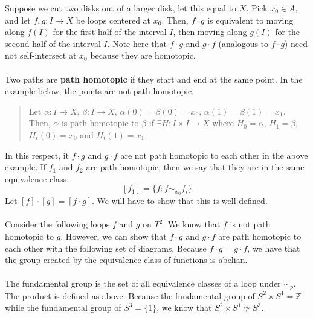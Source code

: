 \documentclass[10pt]{extarticle}
\title{}
\author{Avinash Iyer}
\date{}
\begin{document}
{
\noindent Suppose we cut two disks out of a larger disk, let this equal to $X$. Pick $x_0\in A$, and let $f,g: I\rightarrow X$ be loops centered at $x_0$. Then, $f\cdot g$ is equivalent to moving along $f(I)$ for the first half of the interval $I$, then moving along $g(I)$ for the second half of the interval $I$. Note here that $f\cdot g$ and $g\cdot f$ (analogous to $f\cdot g$) need not self-intersect at $x_0$ because they are homotopic.\\
\\
Two paths are \textbf{path homotopic} if they start and end at the same point. In the example below, the points are not path homotopic.
  \begin{quote}
    Let $\alpha: I\rightarrow X$, $\beta: I\rightarrow X$, $\alpha(0)=\beta(0)=x_0$, $\alpha(1)=\beta(1)=x_1$. Then, $\alpha$ is path homotopic to $\beta$ if $\exists H:I\times I\rightarrow X$ where $H_0 = \alpha$, $H_1 = \beta$, $H_t(0)=x_0$ and $H_t(1)=x_1$.
  \end{quote}
  In this respect, it $f\cdot g$ and $g\cdot f$ are not path homotopic to each other in the above example. If $f_1$ and $f_2$ are path homotopic, then we say that they are in the same equivalence class.
  \[
    [f_1] = \{f: f\sim_{x_0}f_i\}
  \]
  Let $[f]\cdot[g] = [f\cdot g]$. We will have to show that this is well defined.\\
  \\
  Consider the following loops $f$ and $g$ on $T^2$. We know that $f$ is not path homotopic to $g$. However, we can show that $f\cdot g$ and $g\cdot f$ are path homotopic to each other with the following set of diagrams. Because $f\cdot g = g\cdot f$, we have that the group created by the equivalence class of functions is abelian.\\
  \\
  The fundamental group is the set of all equivalence classes of a loop under $\sim_p$. The product is defined as above. Because the fundamental group of $S^2\times S^1 = \mathbb{Z}$ while the fundamental group of $S^3 = \{1\}$, we know that $S^2\times S^1\not\simeq S^3$. 
}
\end{document}
